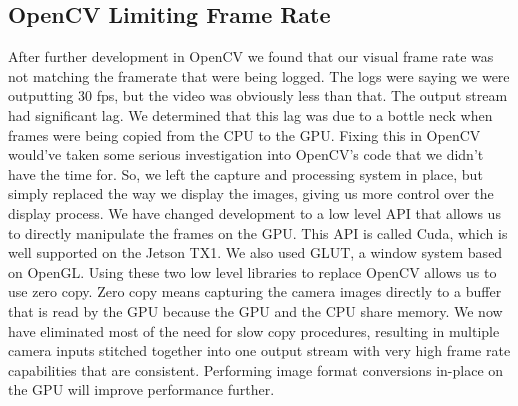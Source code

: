 \documentclass[letterpaper,10pt,titlepage]{IEEEtran}
\begin{document}
   \subsection{OpenCV Limiting Frame Rate}
   After further development in OpenCV we found that our visual frame rate was not matching the framerate that were being logged. The logs were saying we were outputting 30 fps, but the video was obviously less than that. The output stream had significant lag. We determined that this lag was due to a bottle neck when frames were being copied from the CPU to the GPU. Fixing this in OpenCV would've taken some serious investigation into OpenCV's code that we didn't have the time for. So, we left the capture and processing system in place, but simply replaced the way we display the images, giving us more control over the display process. We have changed development to a low level API that allows us to directly manipulate the frames on the GPU. This API is called Cuda, which is well supported on the Jetson TX1. We also used GLUT, a window system based on OpenGL. Using these two low level libraries to replace OpenCV allows us to use zero copy. Zero copy means capturing the camera images directly to a buffer that is read by the GPU because the GPU and the CPU share memory. We now have eliminated most of the need for slow copy procedures, resulting in multiple camera inputs stitched together into one output stream with very high frame rate capabilities that are consistent. Performing image format conversions in-place on the GPU will improve performance further.
    
\end{document}
